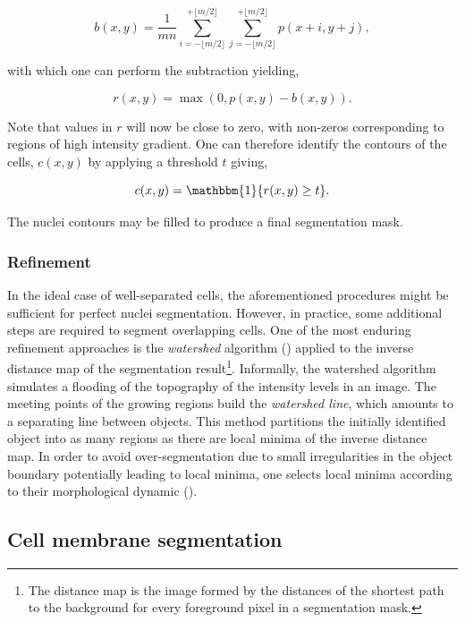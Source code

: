 \begin{equation}
b(x, y) = \frac{1}{mn}\sum_{i = -\lfloor m/2\rfloor}^{+\lfloor m/2\rfloor}\sum_{j= -\lfloor m/2\rfloor}^{+\lfloor m/2\rfloor} p(x +i, y + j),
\end{equation}

with which one can perform the subtraction yielding,

\begin{equation}
r(x, y) = \max(0, p(x, y) - b(x, y)).
\end{equation}

Note that values in $r$ will now be close to zero, with non-zeros corresponding to regions of high intensity gradient. One can therefore identify the contours of the cells, $c(x, y)$ by applying a threshold $t$ giving,

\begin{equation}
c(x, y) = \mathbbm{1}\{r(x, y) \geq t\}.
\end{equation}

The nuclei contours may be filled to produce a final segmentation mask.

\subsubsection{Refinement}

In the ideal case of well-separated cells, the aforementioned procedures might be sufficient for perfect nuclei segmentation. However, in practice, some additional steps are required to segment overlapping cells. One of the most enduring refinement approaches is the \emph{watershed} algorithm (\cite{beucher1979use}) applied to the inverse distance map of the segmentation result\footnote{The distance map is the image formed by the distances of the shortest path to the background for every foreground pixel in a segmentation mask.}. Informally, the watershed algorithm simulates a flooding of the topography of the intensity levels in an image. The meeting points of the growing regions build the \emph{watershed line}, which amounts to a separating line between objects. This method partitions the initially identified object into as many regions as there are local minima of the inverse distance map. In order to avoid over-segmentation due to small irregularities in the object boundary potentially leading to local minima, one selects local minima according to their morphological dynamic (\cite{Grimaud1992}).

\subsection{Cell membrane segmentation}

